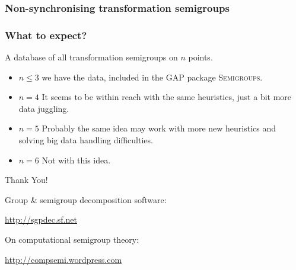 \documentclass{beamer}
\begin{document}
\begin{frame}
\frametitle{Non-synchronising transformation semigroups}
\end{frame}

\begin{frame}\frametitle{What to expect?}
A database of all transformation semigroups on $n$ points.
\begin{itemize}
\item $n\leq 3$ we have the data, included in the \textsc{GAP} package \textsc{Semigroups}.
\item $n=4$ It seems to be within reach with the same heuristics, just a bit more data juggling.
\item $n=5$ Probably the same idea may work with more new heuristics and solving big data handling difficulties.
\item $n=6$ Not with this idea.
\end{itemize}
\end{frame}


\begin{frame}
\begin{center}\Huge Thank You!\end{center}
\normalsize

Group \& semigroup decomposition software:
\begin{center}
\url{http://sgpdec.sf.net}
\end{center}

On computational semigroup theory:
\begin{center}
\url{http://compsemi.wordpress.com}
\end{center}


\end{frame}
\end{document}
